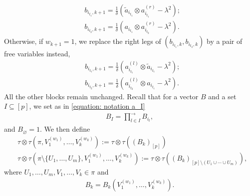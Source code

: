 \documentclass[12pt,reqno]{amsart}
\theoremstyle{plain}
\newcommand{\1}{\mathbf{1}}
\begin{document}
    \begin{align*}
        &b_{i_{t_1},k+1}=\frac{1}{\delta}\left(\tilde{a}_{i_{t_1}}\otimes a_{i_{t_1}}^{(r)}-\lambda^2\right);\\
        &b_{i_{t_2},k+1}=\frac{1}{\delta}\left(a_{i_{t_1}}\otimes a_{i_{t_2}}^{(r)}-\lambda^2\right).
    \end{align*}
Otherwise, if $w_{k+1}=1$, we replace the right legs of $(b_{i_{t_1},k},b_{i_{t_2},k})$ by a pair of free variables instead,
\begin{align*}
    &b_{i_{t_1},k+1}=\frac{1}{\delta}\left(a_{i_{t_1}}^{(l)}\otimes \tilde{a}_{i_{t_1}}-\lambda^2\right);\\
    &b_{i_{t_2},k+1}=\frac{1}{\delta}\left(a_{i_{t_2}}^{(l)}\otimes a_{i_{t_1}}-\lambda^2\right).
\end{align*}
All the other blocks remain unchanged. Recall that for a vector $B$ and a set $I \subseteq [p]$, we set as in \eqref{equation: notation a_I}
\begin{align*}
    B_{I}=\prod_{l \in I}^{\to} B_{i_l},
\end{align*}
and $B_{\varnothing}=1$.
We then define
\begin{align*}
    &\tau\otimes\tau\left(\pi,V_1^{(w_1)},\ldots,V_k^{(w_k)}\right):=\tau\otimes \tau\left(\left(B_{k}\right)_{[p]}\right)\\
    &\tau\otimes\tau \left(\pi\setminus \{U_1,\ldots,U_{m}\},V_1^{(w_1)},\ldots,V_{k}^{(w_{k})}\right):=\tau\otimes \tau\left(\left(B_k\right)_{[p]\setminus \left(U_1\cup\cdots\cup U_{m}\right)}\right),
\end{align*}
where $U_1,\ldots,U_{m},V_1,\ldots,V_{k} \in \pi$ and
\begin{align*}
    B_{k}=B_k\left(V_1^{(w_1)},\dots,V_{k}^{(w_k)}\right).
\end{align*}
\end{document}
